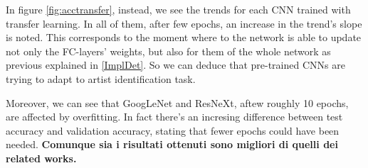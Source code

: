 \documentclass{article}
\begin{document}
In figure \ref{fig:acctransfer}, instead, we see the trends for each CNN trained with transfer learning. In all of them, after few epochs, an increase in the trend's slope is noted. This corresponds to the moment where to the network is able to update not only the FC-layers' weights, but also for them of the whole network as previous explained in \ref{ImplDet}. So we can deduce that pre-trained CNNs are trying to adapt to artist identification task.

Moreover, we can see that GoogLeNet and ResNeXt, aftew roughly 10 epochs, are affected by overfitting. In fact there's an incresing difference between test accuracy and validation accuracy, stating that fewer epochs could have been needed. \textbf{Comunque sia i risultati ottenuti sono migliori di quelli dei related works.}


\end{document}
